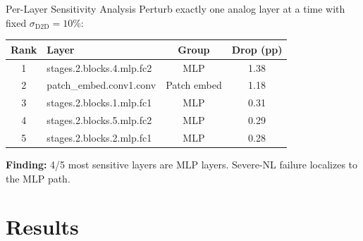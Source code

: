 \documentclass[aspectratio=169,11pt]{beamer}
\begin{document}
\begin{frame}{Per-Layer Sensitivity Analysis}
  Perturb exactly one analog layer at a time with fixed $\sigma_{\text{D2D}} = 10\%$:
  \vfill
  \begin{table}
    \centering
    \small
    \begin{tabular}{clcc}
      \toprule
      Rank & Layer & Group & Drop (pp) \\
      \midrule
      1 & stages.2.blocks.4.mlp.fc2 & MLP & 1.38 \\
      2 & patch\_embed.conv1.conv & Patch embed & 1.18 \\
      3 & stages.2.blocks.1.mlp.fc1 & MLP & 0.31 \\
      4 & stages.2.blocks.5.mlp.fc2 & MLP & 0.29 \\
      5 & stages.2.blocks.2.mlp.fc1 & MLP & 0.28 \\
      \bottomrule
    \end{tabular}
  \end{table}
  \vfill
  \textbf{Finding:} 4/5 most sensitive layers are MLP layers. Severe-NL failure localizes to the MLP path.
\end{frame}

\section{Results}
\end{document}

